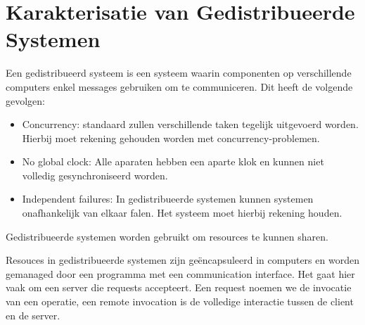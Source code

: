 \documentclass[../samenvatting.tex]{subfiles}
\begin{document}
\chapter{Karakterisatie van Gedistribueerde Systemen}

Een gedistribueerd systeem is een systeem waarin componenten op verschillende computers enkel messages gebruiken om te communiceren. Dit heeft de volgende gevolgen:
\begin{itemize}
	\item Concurrency: standaard zullen verschillende taken tegelijk uitgevoerd worden. Hierbij moet rekening gehouden worden met concurrency-problemen.
	\item No global clock: Alle aparaten hebben een aparte klok en kunnen niet volledig gesynchroniseerd worden. 
	\item Independent failures: In gedistribueerde systemen kunnen systemen onafhankelijk van elkaar falen. Het systeem moet hierbij rekening houden.
\end{itemize}

Gedistribueerde systemen worden gebruikt om resources te kunnen sharen.

Resouces in gedistribueerde systemen zijn geëncapsuleerd in computers en worden gemanaged door een programma met een communication interface. Het gaat hier vaak om een server die requests accepteert. Een request noemen we de invocatie van een operatie, een remote invocation is de volledige interactie tussen de client en de server.
\end{document}
